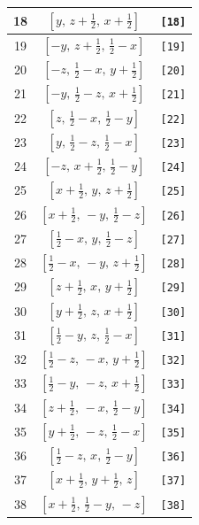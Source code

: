 \documentclass[fleqn,8pt]{jsarticle}
\begin{document}
\begin{longtable}{ccc}
18 & $\left[ y,\, z + \frac{1}{2},\, x + \frac{1}{2} \right]$ & {\tt [18]} \\ \hline
19 & $\left[ - y,\, z + \frac{1}{2},\, \frac{1}{2} - x \right]$ & {\tt [19]} \\ \hline
20 & $\left[ - z,\, \frac{1}{2} - x,\, y + \frac{1}{2} \right]$ & {\tt [20]} \\ \hline
21 & $\left[ - y,\, \frac{1}{2} - z,\, x + \frac{1}{2} \right]$ & {\tt [21]} \\ \hline
22 & $\left[ z,\, \frac{1}{2} - x,\, \frac{1}{2} - y \right]$ & {\tt [22]} \\ \hline
23 & $\left[ y,\, \frac{1}{2} - z,\, \frac{1}{2} - x \right]$ & {\tt [23]} \\ \hline
24 & $\left[ - z,\, x + \frac{1}{2},\, \frac{1}{2} - y \right]$ & {\tt [24]} \\ \hline
25 & $\left[ x + \frac{1}{2},\, y,\, z + \frac{1}{2} \right]$ & {\tt [25]} \\ \hline
26 & $\left[ x + \frac{1}{2},\, - y,\, \frac{1}{2} - z \right]$ & {\tt [26]} \\ \hline
27 & $\left[ \frac{1}{2} - x,\, y,\, \frac{1}{2} - z \right]$ & {\tt [27]} \\ \hline
28 & $\left[ \frac{1}{2} - x,\, - y,\, z + \frac{1}{2} \right]$ & {\tt [28]} \\ \hline
29 & $\left[ z + \frac{1}{2},\, x,\, y + \frac{1}{2} \right]$ & {\tt [29]} \\ \hline
30 & $\left[ y + \frac{1}{2},\, z,\, x + \frac{1}{2} \right]$ & {\tt [30]} \\ \hline
31 & $\left[ \frac{1}{2} - y,\, z,\, \frac{1}{2} - x \right]$ & {\tt [31]} \\ \hline
32 & $\left[ \frac{1}{2} - z,\, - x,\, y + \frac{1}{2} \right]$ & {\tt [32]} \\ \hline
33 & $\left[ \frac{1}{2} - y,\, - z,\, x + \frac{1}{2} \right]$ & {\tt [33]} \\ \hline
34 & $\left[ z + \frac{1}{2},\, - x,\, \frac{1}{2} - y \right]$ & {\tt [34]} \\ \hline
35 & $\left[ y + \frac{1}{2},\, - z,\, \frac{1}{2} - x \right]$ & {\tt [35]} \\ \hline
36 & $\left[ \frac{1}{2} - z,\, x,\, \frac{1}{2} - y \right]$ & {\tt [36]} \\ \hline
37 & $\left[ x + \frac{1}{2},\, y + \frac{1}{2},\, z \right]$ & {\tt [37]} \\ \hline
38 & $\left[ x + \frac{1}{2},\, \frac{1}{2} - y,\, - z \right]$ & {\tt [38]} \\ \hline

\end{longtable}
\end{document}
